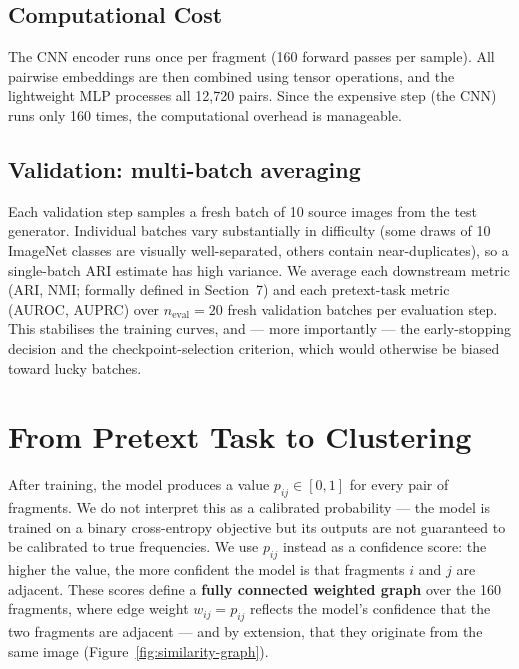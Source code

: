 \documentclass[12pt, a4paper]{article}
\begin{document}
\subsection{Computational Cost}

The CNN encoder runs once per fragment (160 forward passes per sample). All pairwise
embeddings are then combined using tensor operations, and the lightweight MLP processes
all 12,720 pairs. Since the expensive step (the CNN) runs only 160 times, the
computational overhead is manageable.

\subsection{Validation: multi-batch averaging}

Each validation step samples a fresh batch of 10 source images from the test
generator. Individual batches vary substantially in difficulty (some draws of
10 ImageNet classes are visually well-separated, others contain
near-duplicates), so a single-batch ARI estimate has high variance. We
average each downstream metric (ARI, NMI; formally defined in Section~7)
and each pretext-task metric (AUROC, AUPRC) over $n_{\text{eval}} = 20$ fresh
validation batches per evaluation step. This stabilises the training
curves, and --- more importantly --- the early-stopping decision and the
checkpoint-selection criterion, which would otherwise be biased toward
lucky batches.

\section{From Pretext Task to Clustering}

After training, the model produces a value $p_{ij} \in [0, 1]$ for every pair of
fragments. We do not interpret this as a calibrated probability --- the model is
trained on a binary cross-entropy objective but its outputs are not guaranteed to
be calibrated to true frequencies. We use $p_{ij}$ instead as a confidence score:
the higher the value, the more confident the model is that fragments $i$ and $j$
are adjacent. These scores define a \textbf{fully connected weighted graph} over
the 160 fragments, where edge weight $w_{ij} = p_{ij}$ reflects the model's
confidence that the two fragments are adjacent --- and by extension, that they
originate from the same image (Figure~\ref{fig:similarity-graph}).
\end{document}
